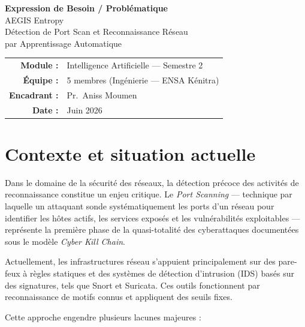 \documentclass[12pt,a4paper]{article}
\begin{document}
\begin{center}
  {\Large\bfseries Expression de Besoin / Probl\'{e}matique}\\[0.6em]
  {\large AEGIS Entropy}\\[0.3em]
  {\large D\'{e}tection de Port Scan et Reconnaissance R\'{e}seau\\[0.2em]
   par Apprentissage Automatique}\\[1.2em]
  \begin{tabular}{rl}
    \textbf{Module :}  & Intelligence Artificielle --- Semestre 2 \\
    \textbf{\'{E}quipe :} & 5 membres (Ing\'{e}nierie --- ENSA K\'{e}nitra) \\
    \textbf{Encadrant :}  & Pr.\ Aniss Moumen \\
    \textbf{Date :}    & Juin 2026 \\
  \end{tabular}
\end{center}

\vspace{1em}

\section{Contexte et situation actuelle}

Dans le domaine de la s\'{e}curit\'{e} des r\'{e}seaux, la d\'{e}tection pr\'{e}coce des activit\'{e}s
de reconnaissance constitue un enjeu critique. Le \textit{Port Scanning} --- technique par
laquelle un attaquant sonde syst\'{e}matiquement les ports d'un r\'{e}seau pour identifier les
h\^{o}tes actifs, les services expos\'{e}s et les vuln\'{e}rabilit\'{e}s exploitables ---
repr\'{e}sente la premi\`{e}re phase de la quasi-totalit\'{e} des cyberattaques document\'{e}es
sous le mod\`{e}le \textit{Cyber Kill Chain}.

Actuellement, les infrastructures r\'{e}seau s'appuient principalement sur des pare-feux \`{a}
r\`{e}gles statiques et des syst\`{e}mes de d\'{e}tection d'intrusion (IDS) bas\'{e}s sur des
signatures, tels que Snort et Suricata.
Ces outils fonctionnent par reconnaissance de motifs connus et appliquent des seuils fixes.

Cette approche engendre plusieurs lacunes majeures :
\end{document}
